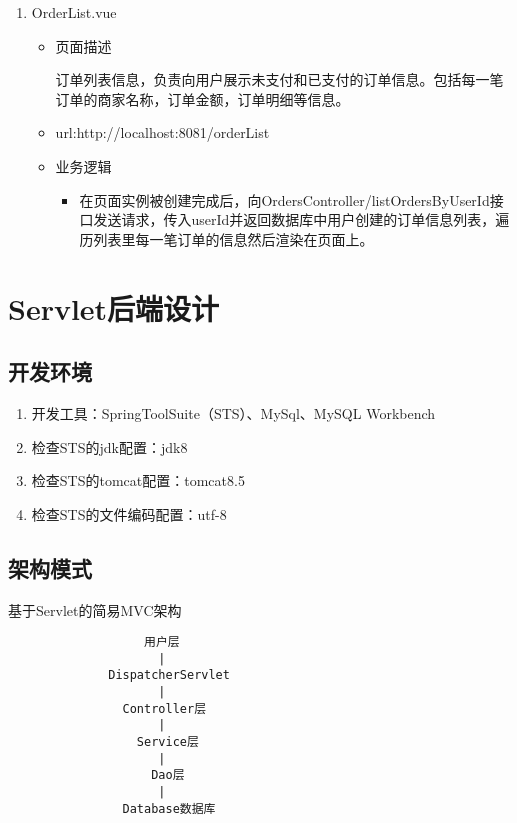 \begin{enumerate}
  \item OrderList.vue
  \begin{itemize}
    \item 页面描述
    
    订单列表信息，负责向用户展示未支付和已支付的订单信息。包括每一笔订单的商家名称，订单金额，订单明细等信息。

    \item url:http://localhost:8081/orderList
    
    \item 业务逻辑
    \begin{itemize}
      \item 在页面实例被创建完成后，向OrdersController/listOrdersByUserId接口发送请求，传入userId并返回数据库中用户创建的订单信息列表，遍历列表里每一笔订单的信息然后渲染在页面上。
      \end{itemize}
  \end{itemize}


\end{enumerate}

\section{Servlet后端设计}

\subsection{开发环境}

\begin{enumerate}
\item 开发工具：SpringToolSuite（STS）、MySql、MySQL Workbench
\item 检查STS的jdk配置：jdk8
\item 检查STS的tomcat配置：tomcat8.5
\item 检查STS的文件编码配置：utf-8
\end{enumerate}


\subsection{架构模式}

基于Servlet的简易MVC架构

\begin{verbatim}
                   用户层
                     |
              DispatcherServlet
                     | 
                Controller层
                     |
                  Service层
                     |
                    Dao层
                     |
                Database数据库
\end{verbatim}


